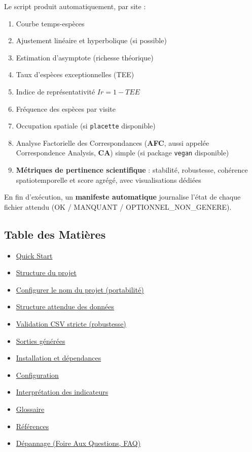 Le script produit automatiquement, par site :

\begin{enumerate}
\def\labelenumi{\arabic{enumi}.}
\tightlist
\item
  Courbe temps-espèces
\item
  Ajustement linéaire et hyperbolique (si possible)
\item
  Estimation d'asymptote (richesse théorique)
\item
  Taux d'espèces exceptionnelles (TEE)
\item
  Indice de représentativité \(Ir = 1 - TEE\)
\item
  Fréquence des espèces par visite
\item
  Occupation spatiale (si \texttt{placette} disponible)
\item
  Analyse Factorielle des Correspondances (\textbf{AFC}, aussi appelée
  Correspondence Analysis, \textbf{CA}) simple (si package
  \texttt{vegan} disponible)
\item
  \textbf{Métriques de pertinence scientifique} : stabilité, robustesse,
  cohérence spatiotemporelle et score agrégé, avec visualisations
  dédiées
\end{enumerate}

En fin d'exécution, un \textbf{manifeste automatique} journalise l'état
de chaque fichier attendu (OK / MANQUANT / OPTIONNEL\_NON\_GENERE).

\subsection{Table des Matières}\label{table-des-matiuxe8res}

\begin{itemize}
\tightlist
\item
  \hyperref[-quick-start]{Quick Start}
\item
  \hyperref[-structure-du-projet]{Structure du projet}
\item
  \hyperref[-configurer-le-nom-du-projet-portabilitux5cux25C3ux5cux25A9]{Configurer
  le nom du projet (portabilité)}
\item
  \hyperref[-structure-attendue-des-donnux5cux25C3ux5cux25A9es]{Structure
  attendue des données}
\item
  \hyperref[-validation-csv-stricte-robustesse]{Validation CSV stricte
  (robustesse)}
\item
  \hyperref[-sorties-gux5cux25C3ux5cux25A9nux5cux25C3ux5cux25A9rux5cux25C3ux5cux25A9es]{Sorties
  générées}
\item
  \hyperref[-installation-et-dux5cux25C3ux5cux25A9pendances]{Installation
  et dépendances}
\item
  \hyperref[-configuration]{Configuration}
\item
  \hyperref[-interprux5cux25C3ux5cux25A9tation-des-indicateurs]{Interprétation
  des indicateurs}
\item
  \hyperref[-glossaire]{Glossaire}
\item
  \hyperref[rux5cux25C3ux5cux25A9fux5cux25C3ux5cux25A9rences]{Références}
\item
  \hyperref[-dux5cux25C3ux5cux25A9pannage-faq]{Dépannage (Foire Aux
  Questions, FAQ)}
\end{itemize}

